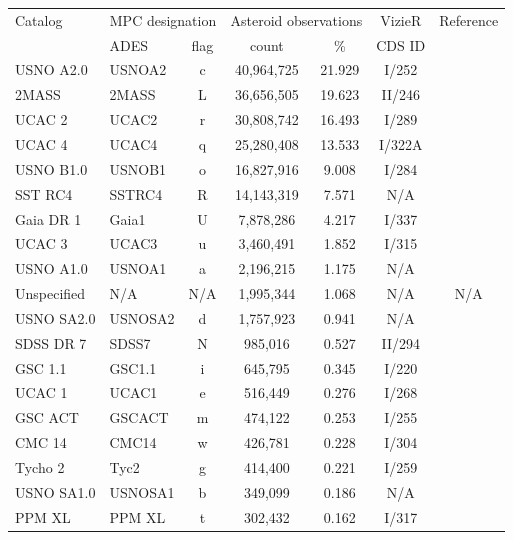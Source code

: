 \documentclass[review]{elsarticle}
\begin{document}
\begin{table}\tiny
\begin{center}
\begin{tabular}{llccccc}
\hline
Catalog & \multicolumn{2}{c}{MPC designation}  & \multicolumn{2}{c}{Asteroid observations} & VizieR & Reference\\
             & ADES  & flag & count &  \%   &  CDS ID &\\
\hline
USNO A2.0   & USNOA2  & c  & 40,964,725 & 21.929 & I/252   &\citet{usnoa2}\\
2MASS       & 2MASS  & L  & 36,656,505 & 19.623 &  II/246   & \citet{2mass}\\
UCAC 2      &  UCAC2 & r  & 30,808,742 & 16.493 & I/289    &\citet{ucac2}\\
UCAC 4      & UCAC4  & q  & 25,280,408 & 13.533 & I/322A       &\citet{ucac4}\\
USNO B1.0   & USNOB1  & o  & 16,827,916 & 9.008 & I/284       &\citet{usnob1}\\
SST RC4     &  SSTRC4 & R  & 14,143,319 & 7.571 & N/A       & \citet{sstrc5} \\
Gaia DR 1    & Gaia1  & U  & 7,878,286 & 4.217 & I/337         &\citet{gaiadr1}\\
UCAC 3      &  UCAC3 & u  & 3,460,491 & 1.852 & I/315         &\citet{ucac3}\\
USNO A1.0   & USNOA1 & a  & 2,196,215 & 1.175 & N/A         &\citet{usnoa1}\\
Unspecified     & N/A & N/A & 1,995,344 & 1.068 & N/A       &N/A\\
USNO SA2.0  & USNOSA2 & d  & 1,757,923 & 0.941 & N/A        &\citet{usnoa2}\\
SDSS DR 7    & SDSS7  & N  & 985,016 & 0.527 & II/294          &\citet{sdss7}\\
GSC 1.1     &  GSC1.1 & i  & 645,795 & 0.345 & I/220          &\citet{gsc1.1}\\
UCAC 1      & UCAC1  & e  & 516,449 & 0.276 &   I/268        &\citet{ucac1}\\
GSC ACT     & GSCACT  & m  & 474,122 & 0.253 & I/255         &\citet{gsc_act}\\
CMC 14      & CMC14  & w  & 426,781 & 0.228 & I/304          &\citet{cmc14}\\
Tycho 2     & Tyc2  & g  & 414,400 & 0.221 &  I/259          &\citet{tycho2}\\
USNO SA1.0  & USNOSA1  & b  & 349,099 & 0.186 & N/A        &\citet{usnoa1}\\
PPM XL       & PPM XL  & t  & 302,432 & 0.162 & I/317         &\citet{ppmxl}\\

\end{tabular}
\end{center}
\end{table}
\end{document}
